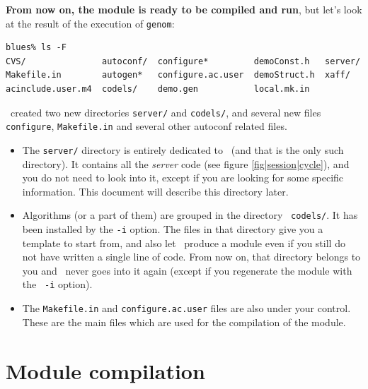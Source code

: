 {\bf From now on, the module is ready to  be compiled and run}, but let's
look at the result of the execution of {\tt genom}:

\begin{center}
\begin{cartouche}\small
\begin{verbatim}
blues% ls -F
CVS/               autoconf/  configure*         demoConst.h   server/
Makefile.in        autogen*   configure.ac.user  demoStruct.h  xaff/
acinclude.user.m4  codels/    demo.gen           local.mk.in
\end{verbatim}
\end{cartouche}
\end{center}

\bigbreak
\GenoM\ created two new directories {\tt server/} and {\tt codels/}, and 
several
new files {\tt configure}, \texttt{Makefile.in} and several other
autoconf related files. 

\begin{itemize}
   \item The {\tt server/} directory  is entirely dedicated to \GenoM\ (and
   that is the only  such directory).  It contains  all the  {\em server}
   code (see figure \ref{fig|session|cycle}), and you do not need to look
   into it, except if you are looking for some specific information. This
   document will describe this directory later.

   \item Algorithms (or a part of them) are grouped in the directory {\tt
   codels/}. It has been  installed by the  {\tt -i} option. The files in
   that directory give you a template to start from, and also let \GenoM\
   produce a module even if you still do not have written a single line of
   code. From now  on,  that directory belongs to  you  and \GenoM\ never
   goes into it again (except if you regenerate  the module with the {\tt
   -i} option).

   \item The  {\tt Makefile.in} and \texttt{configure.ac.user} files
are  also under your control. These are the
   main files which are used for the compilation of the module.

\end{itemize}


\section{Module compilation}
\label{sec|session|compile}

